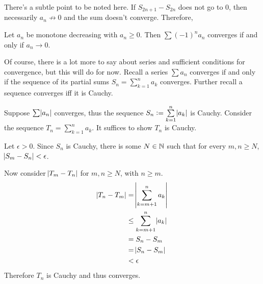 There's a subtle point to be noted here. If $S_{2n + 1} - S_{2n}$ does not go to $0$, then necessarily $a_n \not \to 0$ and the sum doesn't converge. Therefore,
\begin{SNP}{\crl}Let $a_n$ be monotone decreasing with $a_n \geq 0$. Then $\sum (-1)^na_n$ converges if and only if $a_n \to 0$.
\end{SNP}
Of course, there is a lot more to say about series and sufficient conditions for convergence, but this will do for now.
\AnswerSection
\ans Recall a series $\sum a_n$ converges if and only if the sequence of its partial sums $S_n = \sum\limits_{k = 1}^{n}a_k$ converges. Further recall a sequence converges iff it is Cauchy.

Suppose $\sum \abs{a_n}$ converges, thus the sequence $S_n := \sum\limits_{k = 1}^{n}\abs{a_k}$ is Cauchy. Consider the sequence $T_n = \sum\limits_{k = 1}^{n}a_k$. It suffices to show $T_n$ is Cauchy.

Let $\epsilon > 0$. Since $S_n$ is Cauchy, there is some $N \in \mathbb{N}$  such that for every $m, n \geq N$, $\abs{S_m - S_n} < \epsilon$.

Now consider $\abs{T_m - T_n}$ for $m, n \geq N$, with $n \geq m$.
\begin{align*}
\abs{T_n - T_m} &= \abs{\sum\limits_{k = m + 1}^{n}a_k}\\
                &\leq \sum\limits_{k = m + 1}^{n}\abs{a_k}\\
                &= S_n - S_m\\
                &= \abs{S_n - S_m}\\
                &< \epsilon
\end{align*}
Therefore $T_n$ is Cauchy and thus converges.

